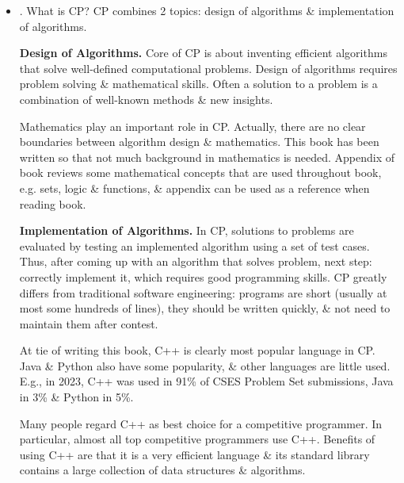 \documentclass{article}
\begin{document}
\begin{itemize}
	\begin{itemize}
		\item {. What is CP?} CP combines 2 topics: design of algorithms \& implementation of algorithms.
		
		{\bf Design of Algorithms.} Core of CP is about inventing efficient algorithms that solve well-defined computational problems. Design of algorithms requires problem solving \& mathematical skills. Often a solution to a problem is a combination of well-known methods \& new insights.
		
		Mathematics play an important role in CP. Actually, there are no clear boundaries between algorithm design \& mathematics. This book has been written so that not much background in mathematics is needed. Appendix of book reviews some mathematical concepts that are used throughout book, e.g. sets, logic \& functions, \& appendix can be used as a reference when reading book.
		
		{\bf Implementation of Algorithms.} In CP, solutions to problems are evaluated by testing an implemented algorithm using a set of test cases. Thus, after coming up with an algorithm that solves problem, next step: correctly implement it, which requires good programming skills. CP greatly differs from traditional software engineering: programs are short (usually at most some hundreds of lines), they should be written quickly, \& not need to maintain them after contest.
		
		At tie of writing this book, C++ is clearly most popular language in CP. Java \& Python also have some popularity, \& other languages are little used. E.g., in 2023, C++ was used in 91\% of CSES Problem Set submissions, Java in 3\% \& Python in 5\%.
		
		Many people regard C++ as best choice for a competitive programmer. In particular, almost all top competitive programmers use C++. Benefits of using C++ are that it is a very efficient language \& its standard library contains a large collection of data structures \& algorithms.
		

\end{itemize}
\end{itemize}
\end{document}
